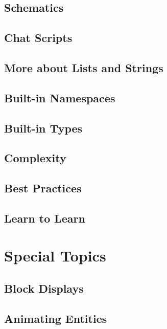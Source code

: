\documentclass[oneside]{book}
\begin{document}
\section{Schematics}
\blindtext

\section{Chat Scripts}
\blindtext

\section{More about Lists and Strings}
\blindtext

\section{Built-in Namespaces}
\blindtext

\section{Built-in Types}
\blindtext

\section{Complexity}
\blindtext

\section{Best Practices}
\blindtext

\section{Learn to Learn}
\blindtext

\chapter{Special Topics}
\blindtext

\section{Block Displays}
\blindtext

\section{Animating Entities}
\blindtext
\end{document}
